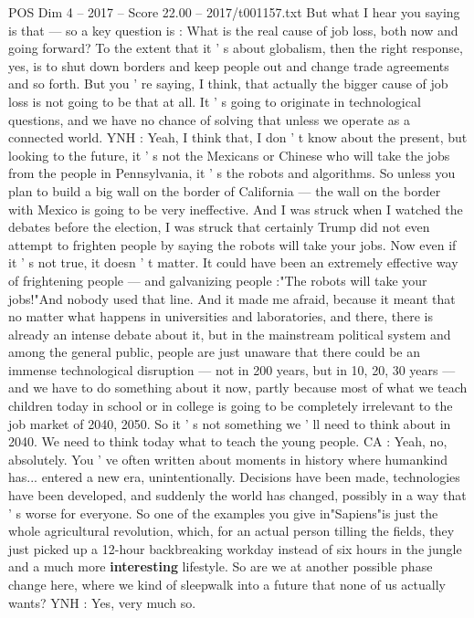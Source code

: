 \begin{textsample}{POS Dim 4 – 2017 – Score 22.00 – 2017/t001157.txt}
But what I hear you saying is that — so a key question is : What is the real cause of job loss, both now and going forward?
To the extent that it ' s about globalism, then the right response, yes, is to shut down borders and keep people out and change trade agreements and so forth.
But you ' re saying, I think, that actually the bigger cause of job loss is not going to be that at all.
It ' s going to originate in technological questions, and we have no chance of solving that unless we operate as a connected world.
YNH : Yeah, I think that, I don ' t know about the present, but looking to the future, it ' s not the Mexicans or Chinese who will take the jobs from the people in Pennsylvania, it ' s the robots and algorithms.
So unless you plan to build a big wall on the border of California — the wall on the border with Mexico is going to be very ineffective.
And I was struck when I watched the debates before the election, I was struck that certainly Trump did not even attempt to frighten people by saying the robots will take your jobs.
Now even if it ' s not true, it doesn ' t matter.
It could have been an extremely effective way of frightening people — and galvanizing people :"The robots will take your jobs!"And nobody used that line.
And it made me afraid, because it meant that no matter what happens in universities and laboratories, and there, there is already an intense debate about it, but in the mainstream political system and among the general public, people are just unaware that there could be an immense technological disruption — not in 200 years, but in 10, 20, 30 years — and we have to do something about it now, partly because most of what we teach children today in school or in college is going to be completely irrelevant to the job market of 2040, 2050.
So it ' s not something we ' ll need to think about in 2040.
We need to think today what to teach the young people.
CA : Yeah, no, absolutely.
You ' ve often written about moments in history where humankind has... entered a new era, unintentionally.
Decisions have been made, technologies have been developed, and suddenly the world has changed, possibly in a way that ' s worse for everyone.
So one of the examples you give in"Sapiens"is just the whole agricultural revolution, which, for an actual person tilling the fields, they just picked up a 12-hour backbreaking workday instead of six hours in the jungle and a much more \textbf{interesting} lifestyle.
So are we at another possible phase change here, where we kind of sleepwalk into a future that none of us actually wants?
YNH : Yes, very much so.

\end{textsample}
